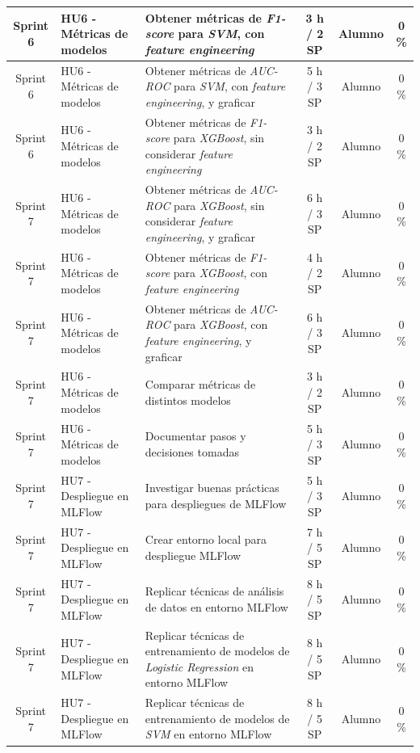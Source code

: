\documentclass[
11pt, %
]{charter}
\begin{document}
\begin{xltabular}{\linewidth}{@{}|c|X|X|c|c|c|@{}}
Sprint 6 & HU6 - Métricas de modelos & Obtener métricas de \textit{F1-score} para \textit{SVM}, con \textit{feature engineering}  & 3 h / 2 SP & Alumno & 0 \%\\ \hline
Sprint 6 & HU6 - Métricas de modelos & Obtener métricas de \textit{AUC-ROC} para \textit{SVM}, con \textit{feature engineering}, y graficar  & 5 h / 3 SP & Alumno & 0 \%\\ \hline
Sprint 6 & HU6 - Métricas de modelos & Obtener métricas de \textit{F1-score} para \textit{XGBoost}, sin  considerar \textit{feature engineering}  & 3 h / 2 SP & Alumno & 0 \%\\ \hline

Sprint 7 & HU6 - Métricas de modelos & Obtener métricas de \textit{AUC-ROC} para \textit{XGBoost}, sin  considerar \textit{feature engineering}, y graficar  & 6 h / 3 SP & Alumno & 0 \%\\ \hline
Sprint 7 & HU6 - Métricas de modelos & Obtener métricas de \textit{F1-score} para \textit{XGBoost}, con \textit{feature engineering}  & 4 h / 2 SP & Alumno & 0 \%\\ \hline
Sprint 7 & HU6 - Métricas de modelos & Obtener métricas de \textit{AUC-ROC} para \textit{XGBoost}, con \textit{feature engineering}, y graficar  & 6 h / 3 SP & Alumno & 0 \%\\ \hline
Sprint 7 & HU6 - Métricas de modelos & Comparar métricas de distintos modelos  & 3 h / 2 SP & Alumno & 0 \%\\ \hline
Sprint 7 & HU6 - Métricas de modelos & Documentar pasos y decisiones tomadas & 5 h / 3 SP & Alumno & 0 \%\\ \hline
Sprint 7 & HU7 - Despliegue en MLFlow  & Investigar buenas prácticas para despliegues de MLFlow  & 5 h / 3 SP & Alumno & 0 \%\\ \hline
Sprint 7 & HU7 - Despliegue en MLFlow  & Crear entorno local para despliegue MLFlow  & 7 h / 5 SP & Alumno & 0 \%\\ \hline
Sprint 7 & HU7 - Despliegue en MLFlow  & Replicar técnicas de análisis de datos en entorno MLFlow  & 8 h / 5 SP & Alumno & 0 \%\\ \hline
Sprint 7 & HU7 - Despliegue en MLFlow  & Replicar técnicas de entrenamiento de modelos de \textit{Logistic Regression} en entorno MLFlow  & 8 h / 5 SP & Alumno & 0 \%\\ \hline
Sprint 7 & HU7 - Despliegue en MLFlow  & Replicar técnicas de entrenamiento de modelos de \textit{SVM} en entorno MLFlow  & 8 h / 5 SP & Alumno & 0 \%\\ \hline

\end{xltabular}
\end{document}
